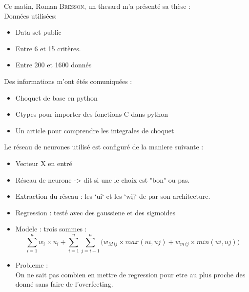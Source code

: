 ﻿Ce matin, Roman \textsc{Bresson}, un thesard m'a présenté sa thèse : \\


Données utilisées:
\begin{itemize}
    \item Data set public
    \item Entre 6 et 15 critères.
    \item Entre 200 et 1600 donnés
\end{itemize}


Des informations m'ont étés comuniquées :
\begin{itemize}
    \item Choquet de base en python
    \item Ctypes pour importer des fonctions C dans python
    \item Un article pour comprendre les integrales de choquet \cite{grabisch2016fuzzy}
\end{itemize}


Le réseau de neurones utilisé est configuré de la maniere suivante :
\begin{itemize}
     \item Vecteur X en entré
     \item Réseau de neurone -> dit si une le choix est "bon" ou pas.
     \item Extraction du réseau : les `ui` et les `wij` de par son architecture.
     \item Regression : testé avec des gaussiene et des sigmoides
     \item Modele : trois sommes :
        \begin{equation}
            \sum_{i=1}^{n}
                w_i \times u_i +
            \sum_{i=1}^{n}\sum_{j=i+1}^{n}
            \Big(
                w_{M\,ij} \times max(ui,uj) + w_{m\,ij} \times min(ui,uj)
            \Big)
        \end{equation}
    \item Probleme : \\
        On ne sait pas combien en mettre de regression pour etre au plus proche des donné sans faire de l'overfeeting.
\end{itemize}
